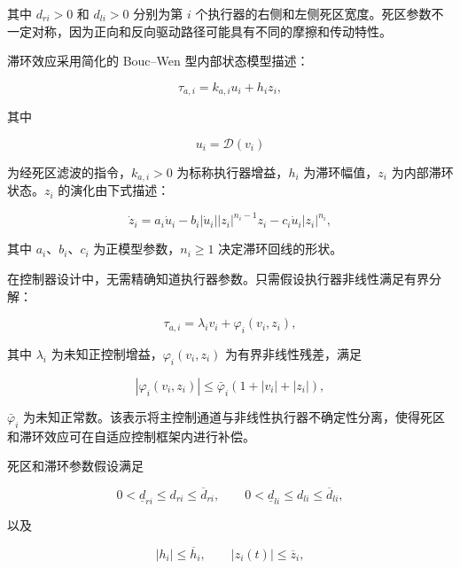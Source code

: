 \documentclass{article}
\begin{document}
其中 $d_{ri}>0$ 和 $d_{li}>0$ 分别为第 $i$ 个执行器的右侧和左侧死区宽度。死区参数不一定对称，因为正向和反向驱动路径可能具有不同的摩擦和传动特性。

滞环效应采用简化的 Bouc--Wen 型内部状态模型描述：

\begin{equation}
\tau_{a,i}=k_{a,i}u_i+h_i z_i, \tag{7}
\end{equation}

其中

\begin{equation*}
u_i=\mathcal{D}(v_i)
\end{equation*}

为经死区滤波的指令，$k_{a,i}>0$ 为标称执行器增益，$h_i$ 为滞环幅值，$z_i$ 为内部滞环状态。$z_i$ 的演化由下式描述：

\begin{equation}
\dot z_i=a_i\dot u_i-b_i|\dot u_i||z_i|^{n_i-1}z_i-c_i\dot u_i|z_i|^{n_i}, \tag{8}
\end{equation}

其中 $a_i$、$b_i$、$c_i$ 为正模型参数，$n_i\geq 1$ 决定滞环回线的形状。

在控制器设计中，无需精确知道执行器参数。只需假设执行器非线性满足有界分解：

\begin{equation}
\tau_{a,i}=\lambda_i v_i+\varphi_i(v_i,z_i), \tag{9}
\end{equation}

其中 $\lambda_i$ 为未知正控制增益，$\varphi_i(v_i,z_i)$ 为有界非线性残差，满足

\begin{equation}
|\varphi_i(v_i,z_i)|\leq\bar\varphi_i\left(1+|v_i|+|z_i|\right), \tag{10}
\end{equation}

$\bar\varphi_i$ 为未知正常数。该表示将主控制通道与非线性执行器不确定性分离，使得死区和滞环效应可在自适应控制框架内进行补偿。

死区和滞环参数假设满足

\begin{equation}
0<\underline d_{ri}\leq d_{ri}\leq\overline d_{ri},\qquad 0<\underline d_{li}\leq d_{li}\leq\overline d_{li}, \tag{11}
\end{equation}

以及

\begin{equation}
|h_i|\leq\overline h_i,\qquad |z_i(t)|\leq\overline z_i, \tag{12}
\end{equation}
\end{document}

